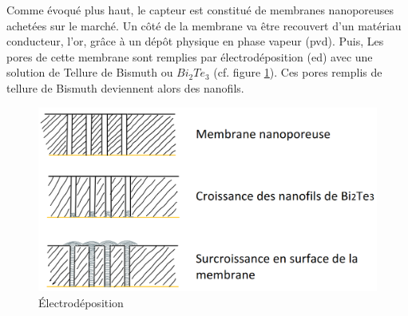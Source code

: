 Comme évoqué plus haut, le capteur est constitué de membranes nanoporeuses achetées sur le marché. 
Un côté de la membrane va être recouvert d'un matériau conducteur, l'or, grâce à un dépôt physique en phase vapeur (\gls{pvd}). Puis, Les pores de cette membrane sont remplies par 
électrodéposition (\gls{ed}) avec une solution de Tellure de Bismuth ou $Bi_2Te_3$ (cf. figure \ref{fig:electrodeposition}). Ces pores remplis de tellure de 
Bismuth deviennent alors des nanofils. 
\begin{figure}[H]
    \centering
    \includegraphics[scale = 0.4]{images/Electrodeposition.png}
    \caption{Électrodéposition}
    \label{fig:electrodeposition}
\end{figure}

